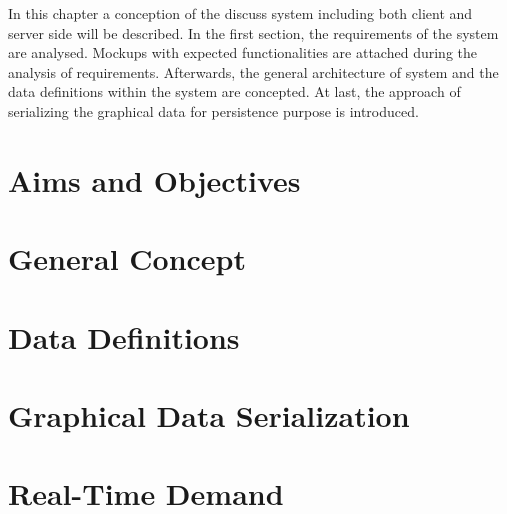 In this chapter a conception of the discuss system including both client and server side will be described. In the first section, the requirements of the system are analysed. Mockups with expected functionalities are attached during the analysis of requirements. Afterwards, the general architecture of system and the data definitions within the system are concepted. At last, the approach of serializing the graphical data for persistence purpose is introduced.


\section{Aims and Objectives}\label{sec:aims}

\section{General Concept}

\section{Data Definitions}\label{sec:data-concept}

\section{Graphical Data Serialization}\label{sec:graphical-data-serialization-concept}

\section{Real-Time Demand}\label{sec:realtime-concept}


% 

